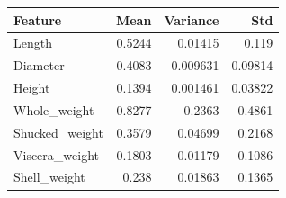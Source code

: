 \begin{tabular}{lrrr}
\toprule
Feature & Mean & Variance & Std \\
\midrule
Length & 0.5244 & 0.01415 & 0.119 \\
Diameter & 0.4083 & 0.009631 & 0.09814 \\
Height & 0.1394 & 0.001461 & 0.03822 \\
Whole\_weight & 0.8277 & 0.2363 & 0.4861 \\
Shucked\_weight & 0.3579 & 0.04699 & 0.2168 \\
Viscera\_weight & 0.1803 & 0.01179 & 0.1086 \\
Shell\_weight & 0.238 & 0.01863 & 0.1365 \\
\bottomrule
\end{tabular}
